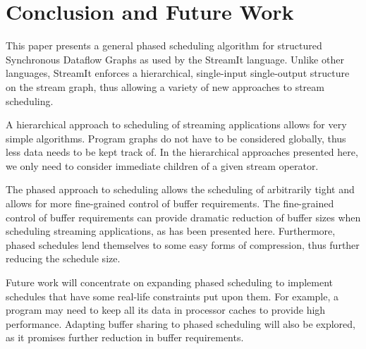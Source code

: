 \section{Conclusion and Future Work}
\label{chpt:conclusion}

This paper presents a general phased scheduling algorithm for
structured Synchronous Dataflow Graphs as used by the StreamIt
language.  Unlike other languages, StreamIt enforces a hierarchical,
single-input single-output structure on the stream graph, thus
allowing a variety of new approaches to stream scheduling.

A hierarchical approach to scheduling of streaming applications allows
for very simple algorithms. Program graphs do not have to be
considered globally, thus less data needs to be kept track of.  In
the hierarchical approaches presented here, we only need to consider
immediate children of a given stream operator.

The phased approach to scheduling allows the scheduling of arbitrarily
tight {\feedbackloops} and allows for more fine-grained control of
buffer requirements. The fine-grained control of buffer requirements
can provide dramatic reduction of buffer sizes when scheduling
streaming applications, as has been presented here. Furthermore,
phased schedules lend themselves to some easy forms of compression,
thus further reducing the schedule size.

Future work will concentrate on expanding phased scheduling to
implement schedules that have some real-life constraints put upon
them. For example, a program may need to keep all its data in
processor caches to provide high performance.  Adapting buffer sharing
to phased scheduling will also be explored, as it promises further
reduction in buffer requirements.
